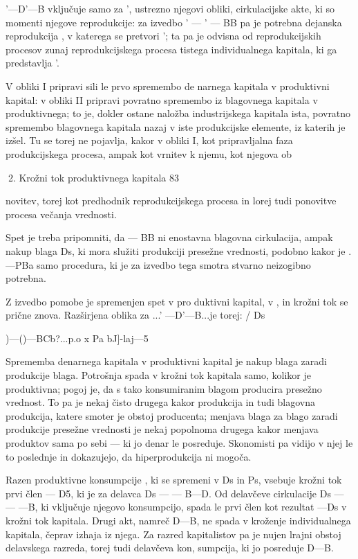 \documentclass[kapital_02.tex]{subfiles}
\begin{document}
\KPEB'—D'—B vključuje samo za \KPEB', ustrezno njegovi obliki, cirkulacijske akte, ki so momenti njegove reprodukcije: za izvedbo \KPEB' — \KPED' — BB pa je potrebna dejanska reprodukcija \KPEB, v katerega se pretvori \KPEB'; ta pa je odvisna od reprodukcijskih procesov zunaj reprodukcijskega procesa tistega individualnega kapitala, ki ga predstavlja \KPEB'.

V obliki I pripravi \KPED sili le prvo spremembo de narnega kapitala v produktivni kapital: v obliki II pripravi povratno spremembo iz blagovnega kapitala v produktivnega; to je, dokler ostane naložba industrijskega kapitala ista, povratno spremembo blagovnega kapitala nazaj v iste produkcijske elemente, iz katerih je izšel. Tu se torej ne pojavlja, kakor v obliki I, kot pripravljalna faza produkcijskega procesa, ampak kot vrnitev k njemu, kot njegova ob





2. Krožni tok produktivnega kapitala 83



 novitev, torej kot predhodnik reprodukcijskega procesa in lorej tudi ponovitve procesa večanja vrednosti.

Spet je treba pripomniti, da \KPED — BB ni enostavna blagovna cirkulacija, ampak nakup blaga Ds, ki mora služiti produkciji presežne vrednosti, podobno kakor je \KPED.—PBa samo procedura, ki je za izvedbo tega smotra stvarno neizogibno potrebna.

Z izvedbo pomobe je spremenjen \KPED spet v pro duktivni kapital, v \KPEP, in krožni tok se prične znova. Razširjena oblika za \KPEP...\KPEB' —D'—B...\KPEP je torej: / Ds

\KPEB)—(\KPED)—BCb?...\KPEP p.o x Pa bJ]-laj—5

Sprememba denarnega kapitala v produktivni kapital je nakup blaga zaradi produkcije blaga. Potrošnja spada v krožni tok kapitala samo, kolikor je produktivna; pogoj je, da s tako konsumiranim blagom producira presežno vrednost. To pa je nekaj čisto drugega kakor produkcija in tudi blagovna produkcija, katere smoter je obstoj producenta; menjava blaga za blago zaradi produkcije presežne vrednosti je nekaj popolnoma drugega kakor menjava produktov sama po sebi — ki jo denar le posreduje. Skonomisti pa vidijo v njej le to poslednje in dokazujejo, da hiperprodukcija ni mogoča.

Razen produktivne konsumpcije \KPED, ki se spremeni v Ds in Ps, vsebuje krožni tok prvi člen \KPED — D5, ki je za delavca Ds — \KPED — B—D. Od delavčeve cirkulacije Ds — \KPED — —B, ki vključuje njegovo konsumpcijo, spada le prvi člen kot rezultat \KPED —Ds v krožni tok kapitala. Drugi akt, namreč D—B, ne spada v kroženje individualnega kapitala, čeprav izhaja iz njega. Za razred kapitalistov pa je nujen lrajni obstoj delavskega razreda, torej tudi delavčeva kon, sumpcija, ki jo posreduje D—B.
\end{document}
